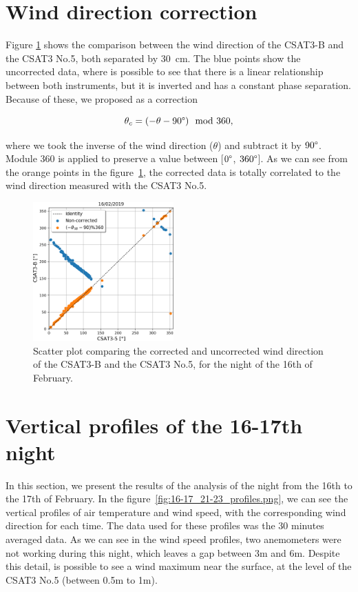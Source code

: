 \label{ch:appendix}

\section{Wind direction correction} \label{app:wind_dir}

Figure \ref{fig:csat3b_correction} shows the comparison between the wind direction of the CSAT3-B and the CSAT3 No.5, both separated by 30~cm. The blue points show the uncorrected data, where is possible to see that there is a linear relationship between both instruments, but it is inverted and has a constant phase separation. Because of these, we proposed as a correction 

$$\theta_{c} = (-\theta-90\degree) \mod 360,$$

\noindent where we took the inverse of the wind direction ($\theta$) and subtract it by $90\degree$. Module 360 is applied to preserve a value between [$0\degree$, $360\degree$]. As we can see from the orange points in the figure~\ref{fig:csat3b_correction}, the corrected data is totally correlated to the wind direction measured with the CSAT3 No.5.

\begin{figure}[!ht]
    \centering
    \includegraphics[width=0.48\textwidth]{fig/chapter_4/csat3b_wind_dir.png}
    \caption{Scatter plot comparing the corrected and uncorrected wind direction of the CSAT3-B and the CSAT3 No.5, for the night of the 16th of February.}
    \label{fig:csat3b_correction}
\end{figure}

\section{Vertical profiles of the 16-17th night} \label{app:profiles}

In this section, we present the results of the analysis of the night from the 16th to the 17th of February. In the figure~\ref{fig:16-17_21-23_profiles.png}, we can see the vertical profiles of air temperature and wind speed, with the corresponding wind direction for each time. The data used for these profiles was the 30 minutes averaged data. As we can see in the wind speed profiles, two anemometers were not working during this night, which leaves a gap between 3m and 6m. Despite this detail, is possible to see a wind maximum near the surface, at the level of the CSAT3 No.5 (between 0.5m to 1m).

